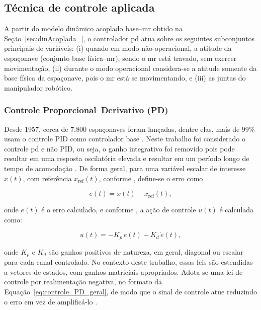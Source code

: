 \subsection{Técnica de controle aplicada}
\label{sec:controle_PD}

A partir do modelo dinâmico acoplado base--\gls{mr} obtido na Seção~\ref{sec:dinAcoplada_}, o controlador \gls{pd} atua sobre os seguintes subconjuntos principais de variáveis:
(i) quando em modo não-operacional, a atitude da espaçonave (conjunto base física--\gls{mr}), sendo o \gls{mr} está travado, sem exercer movimentação,
(ii) durante o modo operacional considera-se a atitude somente da base física da espaçonave, pois o \gls{mr} está se movimentando, e
(iii) as juntas do manipulador robótico.

\subsubsection{Controle Proporcional--Derivativo (PD)}

Desde 1957, cerca de $7.800$ espaçonaves foram lançadas, dentre elas, mais de $99\%$ usam o controle PID como controlador base \cite{xie2016applications}.
Neste trabalho foi considerado o controle \gls{pd} e não PID, ou seja, o ganho integrativo foi removido pois pode resultar em uma resposta oscilatória elevada e resultar em um período longo de tempo de acomodação \cite{razak2007industrial}.
De forma geral, para uma variável escalar de interesse $x(t)$, com referência $x_{\text{ref}}(t)$, conforme \cite{astrom1995pid}, define-se o erro como 

\begin{equation}
e(t) = x(t) - x_{\text{ref}}(t),
\end{equation}

onde $e(t)$ é o erro calculado, e conforme \cite{xue2007linear}, a ação de controle $u(t)$ é calculada como:

\begin{equation}
u(t) = -K_p\,e(t) - K_d\,\dot e(t),
\label{eq:controle_PD_geral}
\end{equation}

onde $K_p$ e $K_d$ são ganhos positivos de natureza, em geral, diagonal ou escalar para cada canal controlado.
No contexto deste trabalho, essas leis são estendidas a vetores de estados, com ganhos matriciais apropriados.
Adota-se uma lei de controle por realimentação negativa, no formato da Equação~\eqref{eq:controle_PD_geral}, de modo que o sinal de controle atue reduzindo o erro em vez de amplificá-lo \cite{ogata2010engenharia}.






